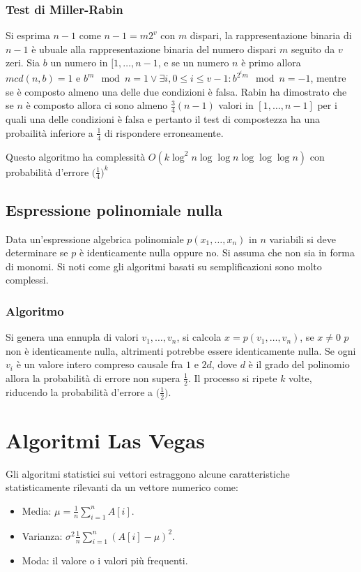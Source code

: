 \subsubsection{Test di Miller-Rabin}
Si esprima $n-1$ come $n-1 = m2^v$ con $m$ dispari, la rappresentazione binaria di $n-1$ \`e ubuale alla rappresentazione binaria del numero dispari $m$ seguito da $v$ zeri. Sia $b$
un numero in $[1, \dots, n - 1$, e se un numero $n$ \`e primo allora $mcd(n, b) = 1$ e $b^m\mod n = 1\lor \exists i, 0\le i \le v -1: b^{2^im}\mod n = -1$, mentre se \`e composto almeno 
una delle due condizioni \`e falsa. Rabin ha dimostrato che se $n$ \`e composto allora ci sono almeno $\frac{3}{4}(n - 1)$ valori in $[1, \dots, n - 1]$ per i quali una delle condizioni
\`e falsa e pertanto il test di compostezza ha una probailit\`a inferiore a $\frac{1}{4}$ di rispondere erroneamente. 

Questo algoritmo ha complessit\`a $O(k\log^2 n\log\log n\log\log\log n)$ con probabilit\`a d'errore $\bigl(\frac{1}{4}\bigr)^k$
\subsection{Espressione polinomiale nulla}
Data un'espressione algebrica polinomiale $p(x_1, \dots, x_n)$ in $n$ variabili si deve determinare se $p$ \`e identicamente nulla oppure no. Si assuma che non sia in forma di monomi. Si
noti come gli algoritmi basati su semplificazioni sono molto complessi. 
\subsubsection{Algoritmo}
Si genera una ennupla di valori $v_1, \dots, v_n$, si calcola $x = p(v_1, \dots, v_n)$, se $x\neq 0$ $p$ non \`e identicamente nulla, altrimenti potrebbe essere identicamente nulla. Se 
ogni $v_i$ \`e un valore intero compreso causale fra $1$ e $2d$, dove $d$ \`e il grado del polinomio allora la probabilit\`a di errore non supera $\frac{1}{2}$. Il processo si ripete
$k$ volte, riducendo la probabilit\`a d'errore a $\bigl(\frac{1}{2}\bigr)$.
\section{Algoritmi Las Vegas}
Gli algoritmi statistici sui vettori estraggono alcune caratteristiche statisticamente rilevanti da un vettore numerico come:
\begin{itemize}
	\item Media: $\mu = \frac{1}{n}\sum\limits_{i = 1}^n A[i]$.
	\item Varianza: $\sigma^2 \frac{1}{n}\sum\limits_{i = 1}^n(A[i] - \mu)^2$.
	\item Moda: il valore o i valori pi\`u frequenti. 
\end{itemize}
